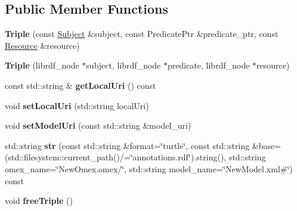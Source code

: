 \subsection*{Public Member Functions}
\begin{DoxyCompactItemize}
\item 
\mbox{\label{classomexmeta_1_1Triple_aaed857f9356dc3a7414f06f393a75ba0}} 
{\bfseries Triple} (const \hyperlink{classomexmeta_1_1Subject}{Subject} \&subject, const Predicate\+Ptr \&predicate\+\_\+ptr, const \hyperlink{classomexmeta_1_1Resource}{Resource} \&resource)
\item 
\mbox{\label{classomexmeta_1_1Triple_adc457c78ec059eb71602e7ea4f763582}} 
{\bfseries Triple} (librdf\+\_\+node $\ast$subject, librdf\+\_\+node $\ast$predicate, librdf\+\_\+node $\ast$resource)
\item 
\mbox{\label{classomexmeta_1_1Triple_a1cb45dd3a5778f0e0e92e4a185da9400}} 
const std\+::string \& {\bfseries get\+Local\+Uri} () const
\item 
\mbox{\label{classomexmeta_1_1Triple_a6694daa46597ea91dda045aa0d5e6cfc}} 
void {\bfseries set\+Local\+Uri} (std\+::string local\+Uri)
\item 
\mbox{\label{classomexmeta_1_1Triple_afd918ecccfa23079d9cb70f2e1a3e9b0}} 
void {\bfseries set\+Model\+Uri} (const std\+::string \&model\+\_\+uri)
\item 
\mbox{\label{classomexmeta_1_1Triple_aabfef726172656b6c61c602b4d8d33e5}} 
std\+::string {\bfseries str} (const std\+::string \&format=\char`\"{}turtle\char`\"{}, const std\+::string \&base=(std\+::filesystem\+::current\+\_\+path()/=\char`\"{}annotations.\+rdf\char`\"{}).string(), std\+::string omex\+\_\+name=\char`\"{}New\+Omex.\+omex/\char`\"{}, std\+::string model\+\_\+name=\char`\"{}New\+Model.\+xml\#\char`\"{}) const
\item 
\mbox{\label{classomexmeta_1_1Triple_a3f3868622349d3a3e14ed3e4b21d49a9}} 
void {\bfseries free\+Triple} ()
\item 
\mbox{\label{classomexmeta_1_1Triple_a2b673a8166a19fb4feae0fc42d31c105}} 

\end{DoxyCompactItemize}
